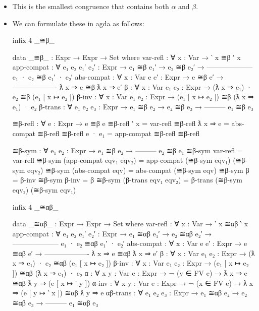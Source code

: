 \documentclass{lecturenotes}
\newcommand{\abs}[2]{\ensuremath{\lambda #1.\,#2}}
\newcommand{\app}[2]{\ensuremath{#1\;#2}}
\newcommand{\FV}{\text{FV}}
\begin{document}
\begin{itemize}
\item This is the smallest congruence that contains both $\alpha$ and $\beta$.
\item We can formulate these in agda as follows:
\begin{code}
infix 4 _≅β_

data _≅β_ : Expr → Expr → Set where
  var-refl : ∀ {x : Var} → ‵ x ≅β ‵ x
  app-compat : ∀ {e₁ e₂ e₁′ e₂′ : Expr} →
         e₁ ≅β e₁′ →
         e₂ ≅β e₂′ →
    --------------------
    e₁ · e₂ ≅β e₁′ · e₂′
  abs-compat : ∀ {x : Var} {e e′ : Expr} →
          e ≅β e′ →
    -------------------
    ƛ x ⇒ e ≅β ƛ x ⇒ e′
  β : ∀ {x : Var} {e₁ e₂ : Expr} →
    (ƛ x ⇒ e₁) · e₂ ≅β (e₁ [ x ↦ e₂ ])
  β-inv : ∀ {x : Var} {e₁ e₂ : Expr} →
    (e₁ [ x ↦ e₂ ]) ≅β (ƛ x ⇒ e₁) · e₂
  β-trans : ∀ {e₁ e₂ e₃ : Expr} →
    e₁ ≅β e₂ →
    e₂ ≅β e₃ →
    ---------
    e₁ ≅β e₃

≅β-refl : ∀ {e : Expr} → e ≅β e
≅β-refl {‵ x} = var-refl
≅β-refl {ƛ x ⇒ e} = abs-compat ≅β-refl
≅β-refl {e · e₁} = app-compat ≅β-refl ≅β-refl

≅β-sym : ∀ {e₁ e₂ : Expr} →
  e₁ ≅β e₂ →
  ---------
  e₂ ≅β e₁
≅β-sym var-refl = var-refl
≅β-sym (app-compat eqv₁ eqv₂) = app-compat (≅β-sym eqv₁) (≅β-sym eqv₂)
≅β-sym (abs-compat eqv) = abs-compat (≅β-sym eqv)
≅β-sym β = β-inv
≅β-sym β-inv = β
≅β-sym (β-trans eqv₁ eqv₂) = β-trans (≅β-sym eqv₂) (≅β-sym eqv₁)
  
infix 4 _≅αβ_

data _≅αβ_ : Expr → Expr → Set where
  var-refl : ∀ {x : Var} → ‵ x ≅αβ ‵ x
  app-compat : ∀ {e₁ e₂ e₁′ e₂′ : Expr} →
         e₁ ≅αβ e₁′ →
         e₂ ≅αβ e₂′ →
    --------------------
    e₁ · e₂ ≅αβ e₁′ · e₂′
  abs-compat : ∀ {x : Var} {e e′ : Expr} →
          e ≅αβ e′ →
    -------------------
    ƛ x ⇒ e ≅αβ ƛ x ⇒ e′
  β : ∀ {x : Var} {e₁ e₂ : Expr} →
    (ƛ x ⇒ e₁) · e₂ ≅αβ (e₁ [ x ↦ e₂ ])
  β-inv : ∀ {x : Var} {e₁ e₂ : Expr} →
    (e₁ [ x ↦ e₂ ]) ≅αβ (ƛ x ⇒ e₁) · e₂
  α : ∀ {x y : Var} {e : Expr} →
    ¬ (y ∈ FV e) →
    ƛ x ⇒ e ≅αβ ƛ y ⇒ (e [ x ↦ ‵ y ])
  α-inv : ∀ {x y : Var} {e : Expr} →
    ¬ (x ∈ FV e) → 
    ƛ x ⇒ (e [ y ↦ ‵ x ]) ≅αβ ƛ y ⇒ e
  αβ-trans : ∀ {e₁ e₂ e₃ : Expr} →
    e₁ ≅αβ e₂ →
    e₂ ≅αβ e₃ →
    ---------
    e₁ ≅αβ e₃


\end{code}
\end{itemize}
\end{document}
